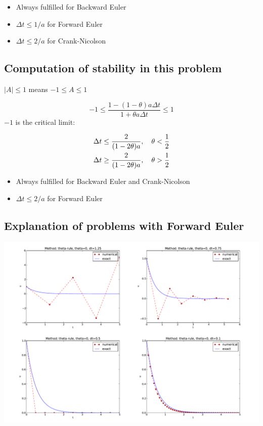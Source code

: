 \documentclass[%
oneside,                 %
final,                   %
10pt]{article}
\begin{document}
\begin{itemize}
 \item Always fulfilled for Backward Euler

 \item $\Delta t \leq 1/a$ for Forward Euler

 \item $\Delta t \leq 2/a$ for Crank-Nicolson
\end{itemize}

\noindent
\subsection*{Computation of stability in this problem}

$|A|\leq 1$ means $-1\leq A\leq 1$

\begin{equation}
-1\leq\frac{1 - (1-\theta) a\Delta t}{1 + \theta a\Delta t} \leq 1
\label{decay:th:stability}
\end{equation}
$-1$ is the critical limit:

\begin{align*}
\Delta t &\leq \frac{2}{(1-2\theta)a},\quad \theta < \half\\ 
\Delta t &\geq \frac{2}{(1-2\theta)a},\quad \theta > {\half}
\end{align*}

\begin{itemize}
 \item Always fulfilled for Backward Euler and Crank-Nicolson

 \item $\Delta t \leq 2/a$ for Forward Euler
\end{itemize}

\noindent
\subsection*{Explanation of problems with Forward Euler}



\centerline{\includegraphics[width=1.1\linewidth]{fig-analysis/FE4c.pdf}}
\end{document}
